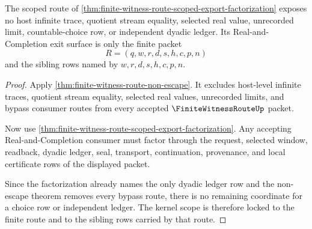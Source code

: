 \begin{theorem}
\label{thm:finite-witness-route-kernel-scope-lock}
The scoped route of \autoref{thm:finite-witness-route-scoped-export-factorization} exposes no host infinite trace, quotient stream equality, selected real value, unrecorded limit, countable-choice row, or independent dyadic ledger. Its Real-and-Completion exit surface is only the finite packet
$$
R=(q,w,r,d,s,h,c,p,n)
$$
and the sibling rows named by $w,r,d,s,h,c,p,n$.
\end{theorem}
\begin{proof}
Apply \autoref{thm:finite-witness-route-non-escape}. It excludes host-level infinite traces, quotient stream equality, selected real values, unrecorded limits, and bypass consumer routes from every accepted $\FiniteWitnessRouteUp$ packet.

Now use \autoref{thm:finite-witness-route-scoped-export-factorization}. Any accepting Real-and-Completion consumer must factor through the request, selected window, readback, dyadic ledger, seal, transport, continuation, provenance, and local certificate rows of the displayed packet.

Since the factorization already names the only dyadic ledger row and the non-escape theorem removes every bypass route, there is no remaining coordinate for a choice row or independent ledger. The kernel scope is therefore locked to the finite route and to the sibling rows carried by that route.
\end{proof}

